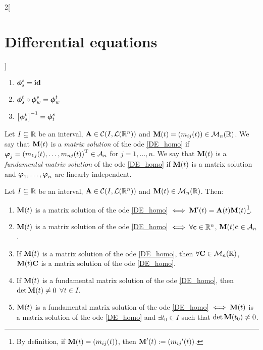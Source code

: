 \documentclass[../../../main.tex]{subfiles}
\begin{document}
\begin{multicols}{2}[\section{Differential equations}]
\begin{corollary}
\begin{enumerate}
      \item $\boldsymbol{\mathrm{\phi}}_s^s=\boldsymbol{\mathrm{\mathrm{id}}}$
      \item $\boldsymbol{\mathrm{\phi}}_s^t\circ\boldsymbol{\mathrm{\phi}}_w^s=\boldsymbol{\mathrm{\phi}}_w^t$
      \item ${\left[\boldsymbol{\mathrm{\phi}}_s^t\right]}^{-1}=\boldsymbol{\mathrm{\phi}}_t^s$
    \end{enumerate}
  \end{corollary}
  \begin{definition}
    Let $I\subseteq \mathbb{R}$ be an interval, $\boldsymbol{\mathrm{A}}\in\mathcal{C}(I,\mathcal{L}(\mathbb{R}^n))$ and $\boldsymbol{\mathrm{M}}(t)=(m_{ij}(t))\in\mathcal{M}_n(\mathbb{R})$. We say that $\boldsymbol{\mathrm{M}}(t)$ is a \textit{matrix solution} of the ode \eqref{DE_homo} if $\boldsymbol{\mathrm{\varphi}}_j={(m_{1j}(t),\ldots,m_{nj}(t))}^\mathrm{T}\in\mathcal{A}_n$ for $j=1,\ldots,n$. We say that $\boldsymbol{\mathrm{M}}(t)$ is a \textit{fundamental matrix solution} of the ode \eqref{DE_homo} if $\boldsymbol{\mathrm{M}}(t)$ is a matrix solution and $\boldsymbol{\mathrm{\varphi}}_1,\ldots,\boldsymbol{\mathrm{\varphi}}_n$ are linearly independent.
  \end{definition}
  \begin{prop}
    Let $I\subseteq \mathbb{R}$ be an interval, $\boldsymbol{\mathrm{A}}\in\mathcal{C}(I,\mathcal{L}(\mathbb{R}^n))$ and $\boldsymbol{\mathrm{M}}(t)\in\mathcal{M}_n(\mathbb{R})$. Then:
    \begin{enumerate}
      \item $\boldsymbol{\mathrm{M}}(t)$ is a matrix solution of the ode \eqref{DE_homo} $\iff\boldsymbol{\mathrm{M}}'(t)=\boldsymbol{\mathrm{A}}(t)\boldsymbol{\mathrm{M}}(t)$\footnote{By definition, if $\boldsymbol{\mathrm{M}}(t)=(m_{ij}(t))$, then $\boldsymbol{\mathrm{M}}'(t):=({m_{ij}}'(t))$.}.
      \item $\boldsymbol{\mathrm{M}}(t)$ is a matrix solution of the ode \eqref{DE_homo} $\iff\forall \boldsymbol{\mathrm{c}}\in\mathbb{R}^n$, $\boldsymbol{\mathrm{M}}(t)\boldsymbol{\mathrm{c}}\in\mathcal{A}_n$.
      \item If $\boldsymbol{\mathrm{M}}(t)$ is a matrix solution of the ode \eqref{DE_homo}, then $\forall \boldsymbol{\mathrm{C}}\in\mathcal{M}_n(\mathbb{R})$, $\boldsymbol{\mathrm{M}}(t)\boldsymbol{\mathrm{C}}$ is a matrix solution of the ode \eqref{DE_homo}.
      \item If $\boldsymbol{\mathrm{M}}(t)$ is a fundamental matrix solution of the ode \eqref{DE_homo}, then $\det\boldsymbol{\mathrm{M}}(t)\ne 0$ $\forall t\in I$.
      \item $\boldsymbol{\mathrm{M}}(t)$ is a fundamental matrix solution of the ode \eqref{DE_homo} $\iff\boldsymbol{\mathrm{M}}(t)$ is a matrix solution of the ode \eqref{DE_homo} and $\exists t_0\in I$ such that $\det\boldsymbol{\mathrm{M}}(t_0)\ne 0$.

\end{enumerate}
\end{prop}
\end{multicols}
\end{document}
